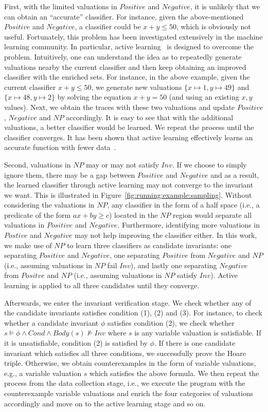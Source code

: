 First, with the limited valuations in $Positive$ and $Negative$, it is unlikely that we can obtain an ``accurate'' classifier. For instance, given the above-mentioned $Positive$ and $Negative$, a classifier could be $x+y \leq 50$, which is obviously not useful. Fortunately, this problem has been investigated extensively in the machine learning community. In particular, active learning~\cite{} is designed to overcome the problem. Intuitively, one can understand the idea as to repeatedly generate valuations nearby the current classifier and then keep obtaining an improved classifier with the enriched sets. For instance, in the above example, given the current classifier $x+y \leq 50$, we generate new valuations $\{x \mapsto 1, y \mapsto 49\}$ and $\{x \mapsto 48, y \mapsto 2\}$ by solving the equation $x+y=50$ (and using an existing $x, y$ values). Next, we obtain the traces with these two valuations and update $Positive$, $Negative$ and $NP$ accordingly. It is easy to see that with the additional valuations, a better classifier would be learned.  We repeat the process until the classifier converges. It has been shown that active learning effectively learns an accurate function with fewer data~\cite{DBLP:conf/icml/SchohnC00}.

Second, valuations in $NP$ may or may not satisfy $Inv$. If we choose to simply ignore them, there may be a gap between $Positive$ and $Negative$ and as a result, the learned classifier through active learning may not converge to the invariant we want. This is illustrated in Figure~\ref{fig:running:example:sampling}. Without considering the valuations in $NP$, any classifier in the form of a half space (i.e., a predicate of the form $ax + by \geq c$) located in the $NP$ region would separate all valuations in $Positive$ and $Negative$. Furthermore, identifying more valuations in $Postive$ and $Negative$ may not help improving the classifier either. In this work, we make use of $NP$ to learn three classifiers as candidate invariants: one separating $Positive$ and $Negative$, one separating $Positive$ from $Negative$ and $NP$ (i.e., assuming valuations in $NP$ fail $Inv$), and lastly one separating $Negative$ from $Positve$ and $NP$ (i.e., assuming valuations in $NP$ satisfy $Inv$). Active learning is applied to all three candidates until they converge.

Afterwards, we enter the invariant verification stage. We check whether any of the candidate invariants satisfies condition (1), (2) and (3). For instance, to check whether a candidate invariant $\phi$ satisfies condition (2), we check whether $s \models \phi \land Cond \land Body(s) \not \models Inv$ where $s$ is any variable valuation is satisfiable. If it is unsatisfiable, condition (2) is satisfied by $\phi$. If there is one candidate invariant which satisfies all three conditions, we successfully prove the Hoare triple. Otherwise, we obtain counterexamples in the form of variable valuations, e.g., a variable valuation $s$ which satisfies the above formula. We then repeat the process from the data collection stage, i.e., we execute the program with the counterexample variable valuations and enrich the four categories of valuations accordingly and move on to the active learning stage and so on.

